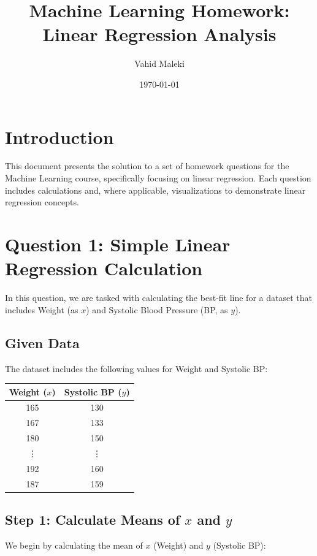 \documentclass{article}
\begin{document}
	
	\title{Machine Learning Homework: Linear Regression Analysis}
	\author{Vahid Maleki}
	\date{\today}
	\maketitle
	
	\section*{Introduction}
	This document presents the solution to a set of homework questions for the Machine Learning course, specifically focusing on linear regression. Each question includes calculations and, where applicable, visualizations to demonstrate linear regression concepts.
	
	\section*{Question 1: Simple Linear Regression Calculation}
	In this question, we are tasked with calculating the best-fit line for a dataset that includes Weight (as \( x \)) and Systolic Blood Pressure (BP, as \( y \)).
	
	\subsection*{Given Data}
	The dataset includes the following values for Weight and Systolic BP:
	
	\begin{center}
		\begin{tabular}{|c|c|}
			\hline
			Weight (\( x \)) & Systolic BP (\( y \)) \\
			\hline
			165 & 130 \\
			167 & 133 \\
			180 & 150 \\
			\vdots & \vdots \\
			192 & 160 \\
			187 & 159 \\
			\hline
		\end{tabular}
	\end{center}
	
	\subsection*{Step 1: Calculate Means of \( x \) and \( y \)}
	We begin by calculating the mean of \( x \) (Weight) and \( y \) (Systolic BP):
	
\end{document}
